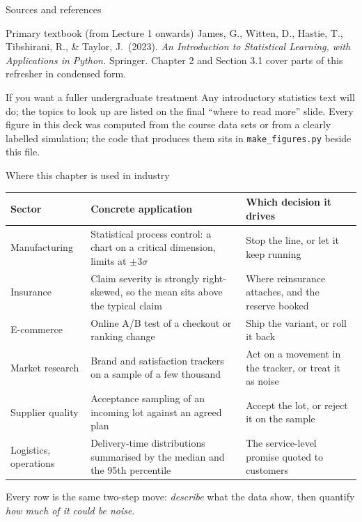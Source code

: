 \documentclass[aspectratio=169,11pt]{beamer}
\begin{document}
\begin{frame}{Sources and references}
  \begin{block}{Primary textbook (from Lecture 1 onwards)}
    James, G., Witten, D., Hastie, T., Tibshirani, R., \& Taylor, J.\ (2023).
    \emph{An Introduction to Statistical Learning, with Applications in
    Python.} Springer. Chapter 2 and Section 3.1 cover parts of this
    refresher in condensed form.
  \end{block}
  \begin{block}{If you want a fuller undergraduate treatment}
    Any introductory statistics text will do; the topics to look up are listed
    on the final ``where to read more'' slide. Every figure in this deck was
    computed from the course data sets or from a clearly labelled simulation;
    the code that produces them sits in \texttt{make\_figures.py} beside this
    file.
  \end{block}
\end{frame}


\begin{frame}{Where this chapter is used in industry}
  \scriptsize
  \begin{center}
  \begin{tabular}{@{}p{2.3cm}p{4.7cm}p{5.4cm}@{}}
    \toprule
    \textbf{Sector} & \textbf{Concrete application} & \textbf{Which decision it drives} \\
    \midrule
    Manufacturing & Statistical process control: a chart on a critical
      dimension, limits at $\pm 3\sigma$ &
      Stop the line, or let it keep running \\
    Insurance & Claim severity is strongly right-skewed, so the mean sits
      above the typical claim &
      Where reinsurance attaches, and the reserve booked \\
    E-commerce & Online A/B test of a checkout or ranking change &
      Ship the variant, or roll it back \\
    Market research & Brand and satisfaction trackers on a sample of a few
      thousand &
      Act on a movement in the tracker, or treat it as noise \\
    Supplier quality & Acceptance sampling of an incoming lot against an
      agreed plan &
      Accept the lot, or reject it on the sample \\
    Logistics, operations & Delivery-time distributions summarised by the
      median and the 95th percentile &
      The service-level promise quoted to customers \\
    \bottomrule
  \end{tabular}
  \end{center}
  \begin{industry}
    Every row is the same two-step move: \emph{describe} what the data show,
    then quantify \emph{how much of it could be noise}.
  \end{industry}
\end{frame}
\end{document}
